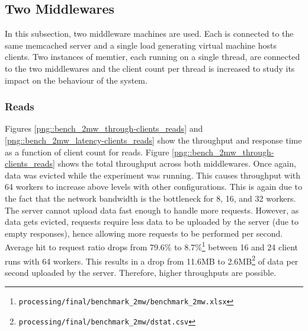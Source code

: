 \documentclass[11pt,a4paper]{article}
\begin{document}
\subsection{Two Middlewares}
In this subsection, two middleware machines are used. Each is connected to the same memcached server and a single load generating virtual machine hosts clients. Two instances of memtier, each running on a single thread, are connected to the two middlewares and the client count per thread is increased to study its impact on the behaviour of the system.

\subsubsection{Reads}
Figures \ref{png::bench_2mw_through-clients_reads} and \ref{png::bench_2mw_latency-clients_reads} show the throughput and response time as a function of client count for reads. Figure \ref{png::bench_2mw_through-clients_reads} shows the total throughput across both middlewares. Once again, data was evicted while the experiment was running. This causes throughput with 64 workers to increase above levels with other configurations. This is again due to the fact that the network bandwidth is the bottleneck for 8, 16, and 32 workers. The server cannot upload data fast enough to handle more requests. However, as data gets evicted, requests require less data to be uploaded by the server (due to empty responses), hence allowing more requests to be performed per second. Average hit to request ratio drops from 79.6\% to 8.7\%\footnote{\texttt{processing/final/benchmark_2mw/benchmark_2mw.xlsx}} between 16 and 24 client runs with 64 workers. This results in a drop from 11.6MB to 2.6MB\footnote{\texttt{processing/final/benchmark_2mw/dstat.csv}} of data per second uploaded by the server. Therefore, higher throughputs are possible.
\end{document}
